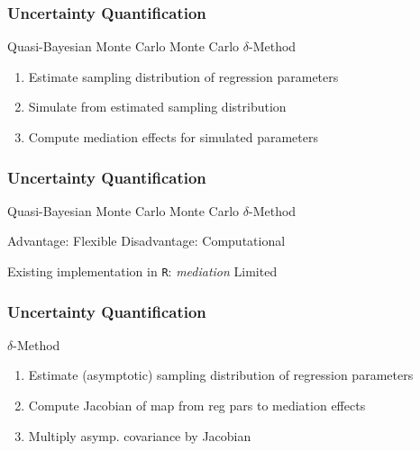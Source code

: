 \documentclass[14pt]{beamer}
\begin{document}
\begin{frame}
    \frametitle{Uncertainty Quantification}
    \begin{outline}
        \1 Quasi-Bayesian Monte Carlo
            \2 Monte Carlo $\delta$-Method \newline
        \end{outline}

        \begin{enumerate}
            \item Estimate sampling distribution of regression parameters
            \item Simulate from estimated sampling distribution
            \item Compute mediation effects for simulated parameters
        \end{enumerate}
\end{frame}

\begin{frame}
    \frametitle{Uncertainty Quantification}
    \begin{outline}
        \1 Quasi-Bayesian Monte Carlo
            \2 Monte Carlo $\delta$-Method \newline

        \1 Advantage: Flexible        
        \1 Disadvantage: Computational \newline

        \1 Existing implementation in \texttt{R}: \textit{mediation}
            \2 Limited
        \end{outline}
\end{frame}




\begin{frame}
    \frametitle{Uncertainty Quantification}
    \begin{outline}
        \1 $\delta$-Method \newline
        \end{outline}

        \begin{enumerate}
            \item Estimate (asymptotic) sampling distribution of regression parameters
            \item Compute Jacobian of map from reg pars to mediation effects
            \item Multiply asymp. covariance by Jacobian
        \end{enumerate}
\end{frame}
\end{document}
